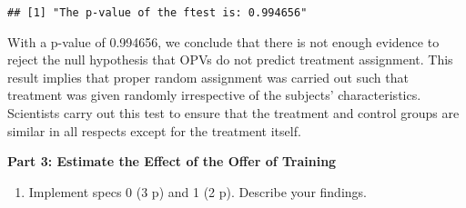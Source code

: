 \documentclass[
]{article}
\newenvironment{Shaded}{\begin{snugshade}}{\end{snugshade}}
\newcommand{\AttributeTok}[1]{\textcolor[rgb]{0.77,0.63,0.00}{#1}}
\newcommand{\CommentTok}[1]{\textcolor[rgb]{0.56,0.35,0.01}{\textit{#1}}}
\newcommand{\DecValTok}[1]{\textcolor[rgb]{0.00,0.00,0.81}{#1}}
\newcommand{\FunctionTok}[1]{\textcolor[rgb]{0.00,0.00,0.00}{#1}}
\newcommand{\NormalTok}[1]{#1}
\newcommand{\OtherTok}[1]{\textcolor[rgb]{0.56,0.35,0.01}{#1}}
\newcommand{\SpecialCharTok}[1]{\textcolor[rgb]{0.00,0.00,0.00}{#1}}
\newcommand{\StringTok}[1]{\textcolor[rgb]{0.31,0.60,0.02}{#1}}
\providecommand{\tightlist}{%
  \setlength{\itemsep}{0pt}\setlength{\parskip}{0pt}}
\begin{document}
\begin{Shaded}
\end{Shaded}

\begin{verbatim}
## [1] "The p-value of the ftest is: 0.994656"
\end{verbatim}

With a p-value of 0.994656, we conclude that there is not enough
evidence to reject the null hypothesis that OPVs do not predict
treatment assignment. This result implies that proper random assignment
was carried out such that treatment was given randomly irrespective of
the subjects' characteristics. Scientists carry out this test to ensure
that the treatment and control groups are similar in all respects except
for the treatment itself.

\textbf{Part 3: Estimate the Effect of the Offer of Training}

\begin{enumerate}
\def\labelenumi{\arabic{enumi}.}
\tightlist
\item
  Implement specs 0 (3 p) and 1 (2 p). Describe your findings.
\end{enumerate}
\end{document}
